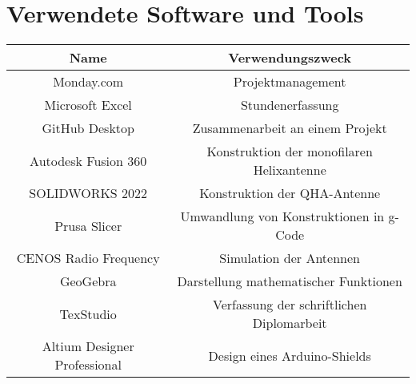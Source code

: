 \chapter{Verwendete Software und Tools}

\begin{tabular}{|c|c|}
	\hline
	\textbf{Name} & \textbf{Verwendungszweck} \\
	\hline
	Monday.com & Projektmanagement \\
	\hline
	Microsoft Excel & Stundenerfassung \\
	\hline
	GitHub Desktop & Zusammenarbeit an einem Projekt\\
	\hline
	Autodesk Fusion 360 & Konstruktion der monofilaren Helixantenne\\
	\hline
	SOLIDWORKS 2022 & Konstruktion der QHA-Antenne\\
	\hline
	Prusa Slicer & Umwandlung von Konstruktionen in g-Code\\
	\hline
	CENOS Radio Frequency & Simulation der Antennen\\
	\hline
	GeoGebra & Darstellung mathematischer Funktionen\\
	\hline
	TexStudio & Verfassung der schriftlichen Diplomarbeit\\
	\hline
	Altium Designer Professional & Design eines Arduino-Shields\\
	\hline
\end{tabular}
